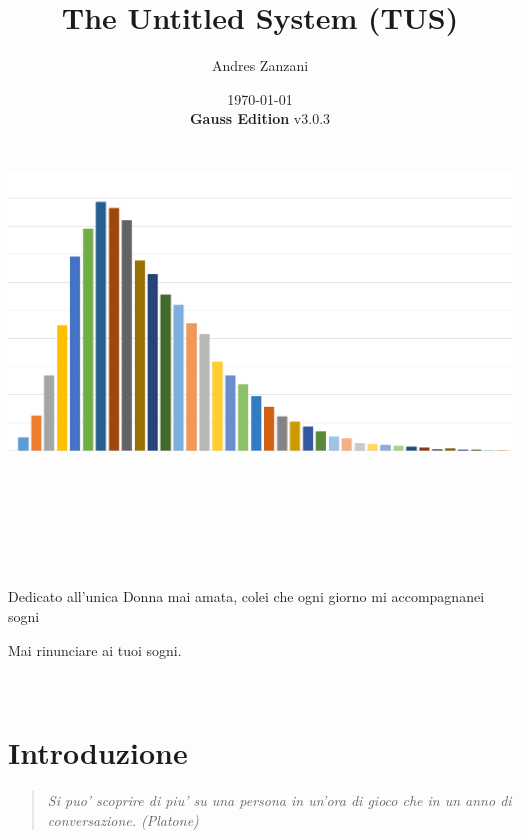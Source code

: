 \documentclass[a4paper,11pt,twoside,openany]{book}
\begin{document}
\title{The Untitled System (TUS)}
\date{\today\\\textbf{Gauss Edition} v3.0.3\\\includegraphics[width=6.85139in,height=3.79514in]{copertina.png}}
\author{Andres Zanzani}
\maketitle
\thispagestyle{empty}

\newpage~\newpage~




Dedicato all'unica Donna mai amata, colei che ogni giorno mi accompagnanei sogni

Mai rinunciare ai tuoi sogni.
\thispagestyle{empty}

\newpage~\thispagestyle{empty}%

\setcounter{page}{0}

\begin{multicols}{2}
\tableofcontents{}
\end{multicols}

\pagebreak{}

\section{Introduzione}

\pagestyle{plain} 
\begin{quote}\textit{Si puo' scoprire di piu' su una persona in un'ora di gioco che in un anno di conversazione. (Platone)
}\end{quote}
\end{document}
